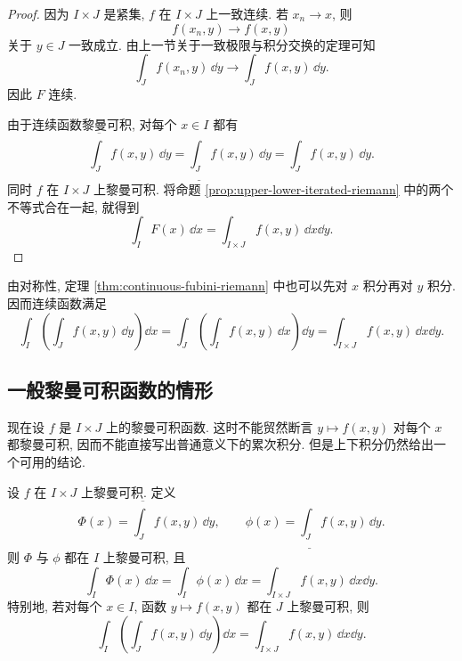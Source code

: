 \begin{proof}
	因为 \(I\times J\) 是紧集, \(f\) 在 \(I\times J\) 上一致连续. 若 \(x_n\to x\), 则
	\[
	f(x_n,y)\longrightarrow f(x,y)
	\]
	关于 \(y\in J\) 一致成立. 由上一节关于一致极限与积分交换的定理可知
	\[
	\int_J f(x_n,y)\,\dd y
	\longrightarrow
	\int_J f(x,y)\,\dd y.
	\]
	因此 \(F\) 连续.
	
	由于连续函数黎曼可积, 对每个 \(x\in I\) 都有
	\[
	\overline{\int_J}f(x,y)\,\dd y
	=
	\underline{\int_J}f(x,y)\,\dd y
	=
	\int_J f(x,y)\,\dd y.
	\]
	同时 \(f\) 在 \(I\times J\) 上黎曼可积. 将命题 \ref{prop:upper-lower-iterated-riemann} 中的两个不等式合在一起, 就得到
	\[
	\int_I F(x)\,\dd x
	=
	\int_{I\times J}f(x,y)\,\dd x\dd y.
	\]
\end{proof}

\begin{rem}
	由对称性, 定理 \ref{thm:continuous-fubini-riemann} 中也可以先对 \(x\) 积分再对 \(y\) 积分. 因而连续函数满足
	\[
	\int_I\left(\int_J f(x,y)\,\dd y\right)\dd x
	=
	\int_J\left(\int_I f(x,y)\,\dd x\right)\dd y
	=
	\int_{I\times J}f(x,y)\,\dd x\dd y.
	\]
\end{rem}

\subsection{一般黎曼可积函数的情形}

现在设 \(f\) 是 \(I\times J\) 上的黎曼可积函数. 这时不能贸然断言
\(y\mapsto f(x,y)\) 对每个 \(x\) 都黎曼可积, 因而不能直接写出普通意义下的累次积分. 但是上下积分仍然给出一个可用的结论.

\begin{thm}[乘积可积函数的上下累次积分]\label{thm:riemann-integrable-iterated-upper-lower}
	设 \(f\) 在 \(I\times J\) 上黎曼可积. 定义
	\[
	\Phi(x)=\overline{\int_J}f(x,y)\,\dd y,
	\qquad
	\phi(x)=\underline{\int_J}f(x,y)\,\dd y.
	\]
	则 \(\Phi\) 与 \(\phi\) 都在 \(I\) 上黎曼可积, 且
	\[
	\int_I \Phi(x)\,\dd x
	=
	\int_I \phi(x)\,\dd x
	=
	\int_{I\times J}f(x,y)\,\dd x\dd y.
	\]
	特别地, 若对每个 \(x\in I\), 函数 \(y\mapsto f(x,y)\) 都在 \(J\) 上黎曼可积, 则
	\[
	\int_I\left(\int_J f(x,y)\,\dd y\right)\dd x
	=
	\int_{I\times J}f(x,y)\,\dd x\dd y.
	\]
\end{thm}

